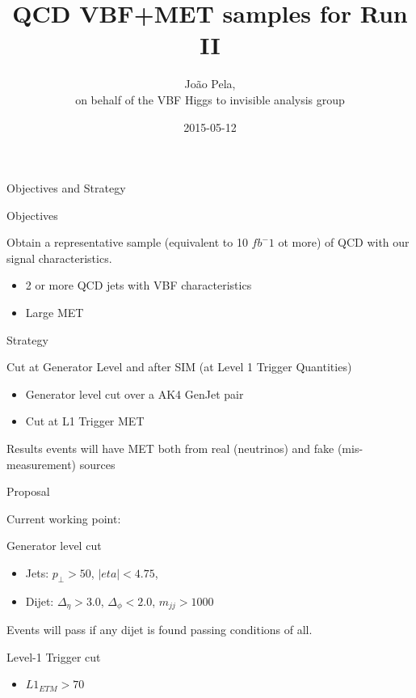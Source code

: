 \documentclass[8pt]{beamer}
\author[J. Pela]{João Pela,\\ on behalf of the VBF Higgs to invisible analysis group}
\title{QCD VBF+MET samples for Run II}
\institute[ICL]{Imperial College London}
\date{2015-05-12}
\begin{document}
\setlength{\unitlength}{1mm}

\begin{frame}
  \titlepage
\end{frame}

\begin{frame}{Objectives and Strategy}

\begin{block}{Objectives}
  
Obtain a representative sample (equivalent to 10 $fb^-1$ ot more) of QCD with our signal characteristics.

\begin{itemize}
  \item 2 or more QCD jets with VBF characteristics
  \item Large MET
\end{itemize}

\end{block}

\begin{block}{Strategy}

Cut at Generator Level and after SIM (at Level 1 Trigger Quantities)

\begin{itemize}
  \item Generator level cut over a AK4 GenJet pair 
  \item Cut at L1 Trigger MET
\end{itemize}

Results events will have MET both from real (neutrinos) and fake (mis-measurement) sources 

\end{block}

\end{frame}


\begin{frame}{Proposal}

Current working point:

\begin{block}{Generator level cut}

\begin{itemize}
  \item Jets: $p_\perp>50$, $|eta|<4.75$, 
  \item Dijet: $\Delta_{\eta}>3.0$, $\Delta_{\phi}<2.0$, $m_{jj}>1000$
\end{itemize}

Events will pass if any dijet is found passing conditions of all.

\end{block}

\begin{block}{Level-1 Trigger cut}

\begin{itemize}
  \item $L1_{ETM}>70$
\end{itemize}

\end{block}

\end{frame}
\end{document}
